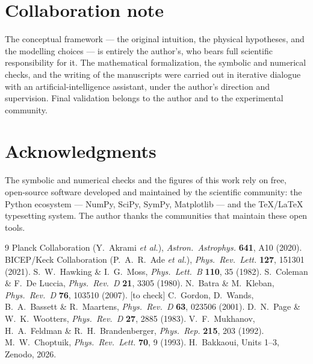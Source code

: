 \documentclass[11pt,a4paper]{article}
\begin{document}
\section*{Collaboration note}
The conceptual framework --- the original intuition, the physical hypotheses, and the modelling choices --- is entirely the author's, who bears full scientific responsibility for it. The mathematical formalization, the symbolic and numerical checks, and the writing of the manuscripts were carried out in iterative dialogue with an artificial-intelligence assistant, under the author's direction and supervision. Final validation belongs to the author and to the experimental community.

\section*{Acknowledgments}
The symbolic and numerical checks and the figures of this work rely on free, open-source software developed and maintained by the scientific community: the Python ecosystem --- NumPy, SciPy, SymPy, Matplotlib --- and the \TeX/\LaTeX{} typesetting system. The author thanks the communities that maintain these open tools.

\begin{thebibliography}{9}
\small
{} Planck Collaboration (Y.\ Akrami \textit{et al.}), \textit{Astron.\ Astrophys.} \textbf{641}, A10 (2020).
 BICEP/Keck Collaboration (P.\ A.\ R.\ Ade \textit{et al.}), \textit{Phys.\ Rev.\ Lett.} \textbf{127}, 151301 (2021).
 S.\ W.\ Hawking \& I.\ G.\ Moss, \textit{Phys.\ Lett.\ B} \textbf{110}, 35 (1982).
 S.\ Coleman \& F.\ De Luccia, \textit{Phys.\ Rev.\ D} \textbf{21}, 3305 (1980).
 N.\ Batra \& M.\ Kleban, \textit{Phys.\ Rev.\ D} \textbf{76}, 103510 (2007). [to check]
 C.\ Gordon, D.\ Wands, B.\ A.\ Bassett \& R.\ Maartens, \textit{Phys.\ Rev.\ D} \textbf{63}, 023506 (2001).
 D.\ N.\ Page \& W.\ K.\ Wootters, \textit{Phys.\ Rev.\ D} \textbf{27}, 2885 (1983).
 V.\ F.\ Mukhanov, H.\ A.\ Feldman \& R.\ H.\ Brandenberger, \textit{Phys.\ Rep.} \textbf{215}, 203 (1992).
 M.\ W.\ Choptuik, \textit{Phys.\ Rev.\ Lett.} \textbf{70}, 9 (1993).
 H.\ Bakkaoui, Units 1--3, Zenodo, 2026.
\end{thebibliography}
\end{document}
